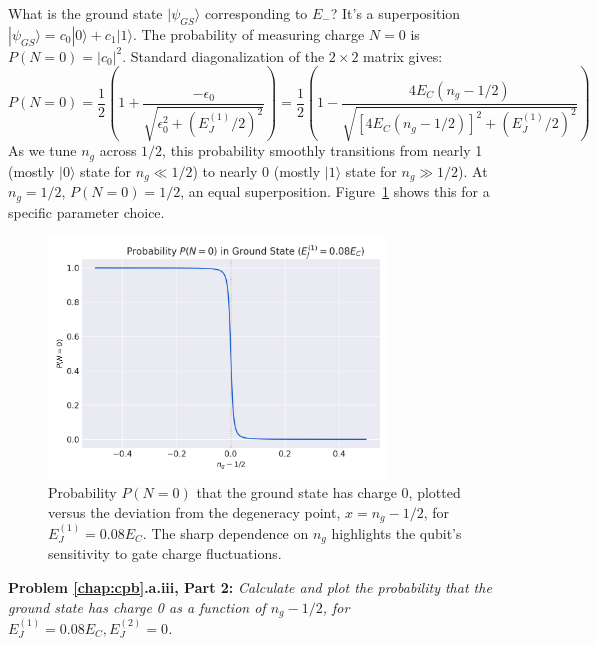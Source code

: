 \documentclass{book}
\newenvironment{problem}[1][Problem]{\par\medskip\noindent\textbf{#1:}\em}{\par\medskip}
\begin{document}
What is the ground state \(|\psi_{GS}\rangle\) corresponding to \(E_{-}\)? It's a superposition \(|\psi_{GS}\rangle = c_0 |0\rangle + c_1 |1\rangle\). The probability of measuring charge \(N=0\) is \(P(N=0) = |c_0|^2\). Standard diagonalization of the \(2\times 2\) matrix gives:
\begin{equation}
P(N=0) = \frac{1}{2} \left( 1 + \frac{-\epsilon_0}{\sqrt{\epsilon_0^2 + (E_J^{(1)}/2)^2}} \right) = \frac{1}{2} \left( 1 - \frac{4 E_C (n_g - 1/2)}{\sqrt{[4 E_C (n_g - 1/2)]^2 + (E_J^{(1)}/2)^2}} \right)
\end{equation}
As we tune \(n_g\) across \(1/2\), this probability smoothly transitions from nearly 1 (mostly \(|0\rangle\) state for \(n_g \ll 1/2\)) to nearly 0 (mostly \(|1\rangle\) state for \(n_g \gg 1/2\)). At \(n_g = 1/2\), \(P(N=0) = 1/2\), an equal superposition. Figure~\ref{fig:charge_prob} shows this for a specific parameter choice.

\begin{figure}[ht]
    \centering
    \includegraphics[width=0.8\textwidth]{fig_charge_prob.png}
    \caption[Ground state charge probability near n\_g=1/2]{Probability \(P(N=0)\) that the ground state has charge 0, plotted versus the deviation from the degeneracy point, \(x = n_g - 1/2\), for \(E_J^{(1)} = 0.08 E_C\). The sharp dependence on \(n_g\) highlights the qubit's sensitivity to gate charge fluctuations.}
    \label{fig:charge_prob}
\end{figure}

\begin{problem}[Problem \ref{chap:cpb}.a.iii, Part 2]
Calculate and plot the probability that the ground state has charge 0 as a function of \(n_g - 1/2\), for \(E_J^{(1)} = 0.08 E_C, E_J^{(2)} = 0\).
\end{problem}
\end{document}

